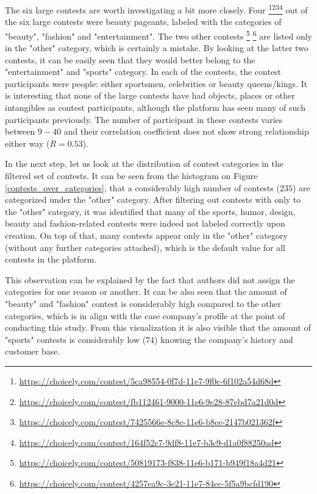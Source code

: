     The six large contests are worth investigating a bit more closely. Four \footnote{\url{https://choicely.com/contest/5ca98554-0f7d-11e7-9f0c-6f102a54d68d}}\footnote{\url{https://choicely.com/contest/fb112461-9000-11e6-9e28-87ebd7a21d0d}}\footnote{\url{https://choicely.com/contest/7425566e-8c8e-11e6-b8ce-2147b021362f}}\footnote{\url{https://choicely.com/contest/164f52c7-9df8-11e7-b3c9-d1a0f88250ad}}
    out of the six large contests were beauty pageants, labeled with the categories of "beauty", "fashion" and "entertainment". The two other contests
        \footnote{\url{https://choicely.com/contest/50819173-f838-11e6-b171-b949f18a4d21}}
        \footnote{\url{https://choicely.com/contest/4257ea9c-3e21-11e7-84ec-5f5a9bcfd190}}
    are listed only in the "other" category, which is certainly a mistake. By looking at the latter two contests, it can be easily seen that they would better belong to the "entertainment" and "sports" category. In each of the contests, the contest participants were people: either sportsmen, celebrities or beauty queens/kings. It is interesting that none of the large contests have had objects, places or other intangibles as contest participants, although the platform has seen many of such participants previously. The number of participant in these contests varies between $9-40$ and their correlation coefficient does not show strong relationship either way ($R = 0.53$). 

    In the next step, let us look at the distribution of contest categories in the filtered set of contests. It can be seen from the histogram on Figure \ref{contests_over_categories}, that a considerably high number of contests ($235$) are categorized under the "other" category. After filtering out contests with only to the "other" category, it was identified that many of the sports, humor, design, beauty and fashion-related contests were indeed not labeled correctly upon creation. On top of that, many contests appear only in the "other" category (without any further categories attached), which is the default value for all contests in the platform.
    
    This observation can be explained by the fact that authors did not assign the categories for one reason or another. It can be also seen that the amount of "beauty" and "fashion" contest is considerably high compared to the other categories, which is in align with the case company's profile at the point of conducting this study. From this visualization it is also visible that the amount of "sports" contests is considerably low ($74$) knowing the company's history and customer base. 

